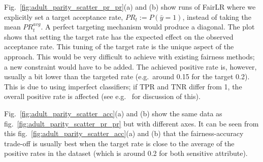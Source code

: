 Fig.~\ref{fig:adult_parity_scatter_pr_pr}(a) and (b) show runs of FairLR
where we explicitly set a target acceptance rate, $\mathit{PR}_t := P(\bar{y}=1)$,
instead of taking the mean $\mathit{PR}_t^{avg}$.
A perfect targeting mechanism would produce a diagonal.
The plot shows that setting the target rate has the expected effect on the observed acceptance rate.
This tuning of the target rate is the unique aspect of the approach.
This would be very difficult to achieve with existing fairness methods;
a new constraint would have to be added.
The achieved positive rate is, however, usually a bit lower than the targeted rate (e.g.\ around 0.15 for the target 0.2).
This is due to using imperfect classifiers;
if TPR and TNR differ from 1,
the overall positive rate is affected (see e.g.\ \citet{forman2005counting} for discussion of this).

Fig.~\ref{fig:adult_parity_scatter_acc}(a) and (b) show the same data
as fig.~\ref{fig:adult_parity_scatter_pr_pr} but with different axes.
It can be seen from this fig.~\ref{fig:adult_parity_scatter_acc}(a) and (b)
that the fairness-accuracy trade-off is usually best
when the target rate is close to the average of the positive rates in the dataset
(which is around 0.2 for both sensitive attribute).

